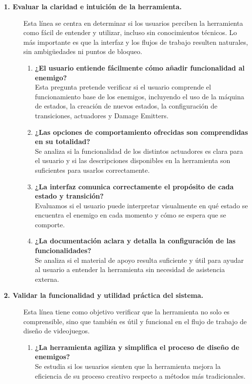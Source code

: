\begin{description}
	\item[\textbf{1. Evaluar la claridad e intuición de la herramienta.}]
Esta línea se centra en determinar si los usuarios perciben la herramienta como fácil de entender y utilizar, incluso sin conocimientos técnicos. Lo más importante es que la interfaz y los flujos de trabajo resulten naturales, sin ambigüedades ni puntos de bloqueo.

	\begin{enumerate}
		\item \textbf{¿El usuario entiende fácilmente cómo añadir funcionalidad al enemigo?}\\
 Esta pregunta pretende verificar si el usuario comprende el funcionamiento base de los enemigos, incluyendo el uso de la máquina de estados, la creación de nuevos estados, la configuración de transiciones, actuadores y Damage Emitters.

		\item \textbf{¿Las opciones de comportamiento ofrecidas son comprendidas en su totalidad?}\\
 Se analiza si la funcionalidad de los distintos actuadores es clara para el usuario y si las descripciones disponibles en la herramienta son suficientes para usarlos correctamente.

		\item \textbf{¿La interfaz comunica correctamente el propósito de cada estado y transición?}\\
 Evaluamos si el usuario puede interpretar visualmente en qué estado se encuentra el enemigo en cada momento y cómo se espera que se comporte.

		\item \textbf{¿La documentación aclara y detalla la configuración de las funcionalidades?}\\
 Se analiza si el material de apoyo resulta suficiente y útil para ayudar al usuario a entender la herramienta sin necesidad de asistencia externa.
	\end{enumerate}

	\item[\textbf{2. Validar la funcionalidad y utilidad práctica del sistema.}]
 Esta línea tiene como objetivo verificar que la herramienta no solo es comprensible, sino que también es útil y funcional en el flujo de trabajo de diseño de videojuegos.

	\begin{enumerate}
		\item \textbf{¿La herramienta agiliza y simplifica el proceso de diseño de enemigos?}\\
 Se estudia si los usuarios sienten que la herramienta mejora la eficiencia de su proceso creativo respecto a métodos más tradicionales.


\end{enumerate}
\end{description}
